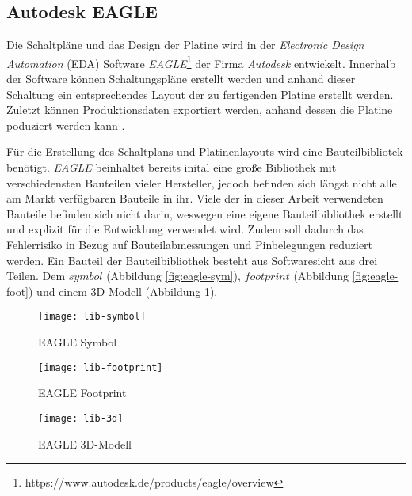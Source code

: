 
\subsection{Autodesk EAGLE}
Die Schaltpläne und das Design der Platine wird in der \textit{Electronic Design Automation} (EDA) Software \textit{EAGLE}\footnote{https://www.autodesk.de/products/eagle/overview} der Firma \textit{Autodesk} entwickelt. Innerhalb der Software können Schaltungspläne erstellt werden und anhand dieser Schaltung ein entsprechendes Layout der zu fertigenden Platine erstellt werden. Zuletzt können Produktionsdaten exportiert werden, anhand dessen die Platine poduziert werden kann \cite{eagle_homepage}.

Für die Erstellung des Schaltplans und Platinenlayouts wird eine Bauteilbibliotek benötigt. \textit{EAGLE} beinhaltet bereits inital eine große Bibliothek mit verschiedensten Bauteilen vieler Hersteller, jedoch befinden sich längst nicht alle am Markt verfügbaren Bauteile in ihr. Viele der in dieser Arbeit verwendeten Bauteile befinden sich nicht darin, weswegen eine eigene Bauteilbibliothek erstellt und explizit für die Entwicklung verwendet wird. Zudem soll dadurch das Fehlerrisiko in Bezug auf Bauteilabmessungen und Pinbelegungen reduziert werden. Ein Bauteil der Bauteilbibliothek besteht aus Softwaresicht aus drei Teilen. Dem $symbol$ (Abbildung \ref{fig:eagle-sym}), $footprint$ (Abbildung \ref{fig:eagle-foot}) und einem 3D-Modell (Abbildung \ref{fig:eagle-3d}).
\begin{figure}[h]
	\centering
	\begin{minipage}{.3\linewidth}
		\centering
		\texttt{[image: lib-symbol]}
		\caption{EAGLE Symbol}
		\label{fig:eagle-sym}
	\end{minipage}
	\hfill
	\begin{minipage}{.3\linewidth}
		\centering
		\texttt{[image: lib-footprint]}
		\caption{EAGLE Footprint}
		\label{fig:eagle-foot}
	\end{minipage}
	\hfill
	\begin{minipage}{.3\linewidth}
		\centering
		\texttt{[image: lib-3d]}
		\caption{EAGLE 3D-Modell}
		\label{fig:eagle-3d}
	\end{minipage}
\end{figure}
